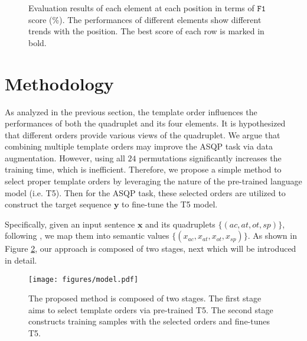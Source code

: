 \documentclass[11pt]{article}
\begin{document}
\begin{figure}[t]
\centering
{}
\caption{Evaluation results of each element at each position in terms of $\mathtt{F1}$ score (\%). The performances of different elements show different trends with the position. The best score of each row is marked in bold.}
\label{fig:figure_pre}
\end{figure}





\section{Methodology}




As analyzed in the previous section, the template order influences the performances of both the quadruplet and its four elements. It is hypothesized that different orders provide various views of the quadruplet. We argue that combining multiple template orders may improve the ASQP task via data augmentation. However, using all $24$ permutations significantly increases the training time, which is inefficient. Therefore, we propose a simple method to select proper template orders by leveraging the nature of the pre-trained language model (i.e. T5). Then for the ASQP task, these selected orders are utilized to construct the target sequence $\bm{y}$ to fine-tune the T5 model. 



Specifically, given an input sentence $\bm{x}$ and its quadruplets $\{({ac},{at},{ot},{sp})\}$, following \citet{zhang-etal-2021-aspect-sentiment}, we map them into semantic values $\{(x_{ac},x_{at},x_{ot},x_{sp})\}$. As shown in Figure \ref{fig:model}, our approach is composed of two stages, next which will be introduced in detail. 

\begin{figure}[t]
\centering
\texttt{[image: figures/model.pdf]} 
\caption{The proposed method is composed of two stages. The first stage aims to select template orders via pre-trained T5. The second stage constructs training samples with the selected orders and fine-tunes T5.}
\label{fig:model}
\end{figure}
\end{document}
